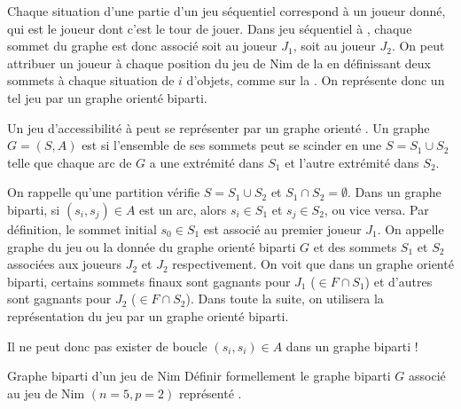 \documentclass[12pt,fancy]{cours}
\begin{document}
Chaque situation d'une partie d'un jeu séquentiel correspond à un joueur donné, qui est le joueur dont c'est le tour de jouer. Dans jeu séquentiel à , chaque sommet du graphe est donc associé soit au joueur $J_1$, soit au joueur $J_2$. On peut attribuer un joueur à chaque position du jeu de Nim de la \Fig{} en définissant deux sommets à chaque situation de $i$ d'objets, comme sur la \Fig{}. On représente donc un tel jeu par un graphe orienté biparti.
\begin{definition}\label{def:biparti}
  Un jeu d'accessibilité à  peut se représenter par un graphe orienté .
   Un graphe $G=(S,A)$ est  si l'ensemble de ses sommets peut se scinder en une  $S=S_1 \cup S_2$ telle que chaque arc de $G$ a une extrémité dans $S_1$ et l'autre extrémité dans $S_2$.
\end{definition}
 On rappelle qu'une partition vérifie $S=S_1 \cup S_2$ et $S_1 \cap S_2 = \emptyset$. Dans un graphe biparti, si $(s_i,s_j) \in A$ est un arc, alors $s_i \in S_1$ et $s_j \in S_2$, ou vice versa. Par définition, le sommet initial $s_0 \in S_1$ est associé au premier joueur $J_1$. On appelle graphe du jeu ou  la donnée du graphe orienté biparti $G$ et des sommets $S_1$ et $S_2$ associées aux joueurs $J_2$ et $J_2$ respectivement. On voit que dans un graphe orienté biparti, certains sommets finaux sont gagnants pour $J_1$ ($\in F \cap S_1$) et d'autres sont gagnants pour $J_2$ ($\in F \cap S_2$).
 Dans toute la suite, on utilisera la représentation du jeu par un graphe orienté biparti.

 \begin{remarque}
   Il ne peut donc pas exister de boucle $(s_i,s_i) \in A$ dans un graphe biparti !
 \end{remarque}

 \begin{exemple}{Graphe biparti d'un jeu de Nim}
 Définir formellement le graphe biparti $G$ associé au jeu de Nim $(n=5,p=2)$ représenté \Fig{}.
 \end{exemple}
\end{document}
